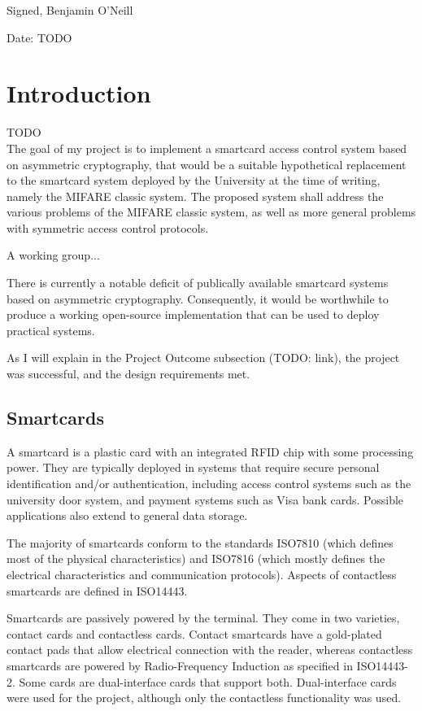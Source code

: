 \documentclass[12pt]{article}
\begin{document}
Signed, Benjamin O'Neill

\vspace{0.2in}
Date: TODO
\pagebreak

\tableofcontents
\pagebreak

\section{Introduction}
TODO\\

The goal of my project is to implement a smartcard access control system based on asymmetric cryptography, that would be a suitable hypothetical replacement to the smartcard system deployed by the University at the time of writing, namely the MIFARE classic system. The proposed system shall address the various problems of the MIFARE classic system, as well as more general problems with symmetric access control protocols.

A working group...

There is currently a notable deficit of publically available smartcard systems based on asymmetric cryptography. Consequently, it would be worthwhile to produce a working open-source implementation that can be used to deploy practical systems.

As I will explain in the Project Outcome subsection (TODO: link), the project was successful, and the design requirements met.

 
\subsection{Smartcards}
A smartcard is a plastic card with an integrated RFID chip with some processing power. They are typically deployed in systems that require secure personal identification and/or authentication, including access control systems such as the university door system, and payment systems such as Visa bank cards. Possible applications also extend to general data storage.

The majority of smartcards conform to the standards ISO7810 (which defines most of the physical characteristics) and ISO7816 (which mostly defines the electrical characteristics and communication protocols). Aspects of contactless smartcards are defined in ISO14443.

Smartcards are passively powered by the terminal. They come in two varieties, contact cards and contactless cards. Contact smartcards have a gold-plated contact pads that allow electrical connection with the reader, whereas contactless smartcards are powered by Radio-Frequency Induction as specified in ISO14443-2. Some cards are dual-interface cards that support both. Dual-interface cards were used for the project, although only the contactless functionality was used.
\end{document}

